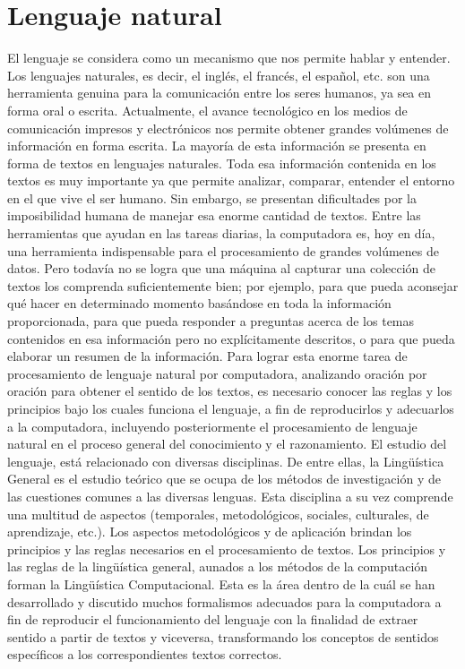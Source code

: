 \section{Lenguaje natural}
El lenguaje se considera como un mecanismo que nos permite hablar y entender. Los lenguajes naturales, es decir, el ingl\'es, el franc\'es, el espa\~nol, etc. son una herramienta genuina para la comunicaci\'on entre los seres humanos, ya sea en forma oral o escrita.
Actualmente, el avance tecnol\'ogico en los medios de comunicaci\'on impresos y electr\'onicos nos permite obtener grandes vol\'umenes de informaci\'on en forma escrita. La mayor\'ia de esta informaci\'on se presenta en forma de textos en lenguajes naturales. Toda esa informaci\'on contenida en los textos es muy importante ya que permite analizar, comparar, entender el entorno en el que vive el ser humano.
Sin embargo, se presentan dificultades por la imposibilidad humana de manejar esa enorme cantidad de textos. Entre las herramientas que ayudan en las tareas diarias, la computadora es, hoy en d\'ia, una herramienta indispensable para el procesamiento de grandes vol\'umenes de datos. Pero todav\'ia no se logra que una m\'aquina al capturar una colecci\'on de textos los comprenda suficientemente bien; por ejemplo, para que pueda aconsejar qu\'e hacer en determinado momento bas\'andose en toda la informaci\'on proporcionada, para que pueda responder a preguntas acerca de los temas contenidos en esa informaci\'on pero no expl\'icitamente descritos, o para que pueda elaborar un resumen de la informaci\'on.
Para lograr esta enorme tarea de procesamiento de lenguaje natural por computadora, analizando oraci\'on por oraci\'on para obtener el sentido de los textos, es necesario conocer las reglas y los principios bajo los cuales funciona el lenguaje, a fin de reproducirlos y adecuarlos a la computadora, incluyendo posteriormente el procesamiento de lenguaje natural en el proceso general del conocimiento y el razonamiento.
El estudio del lenguaje, est\'a relacionado con diversas disciplinas. De entre ellas, la Ling\"u\'istica General es el estudio te\'orico que se ocupa de los m\'etodos de investigaci\'on y de las cuestiones comunes a las diversas lenguas. Esta disciplina a su vez comprende una multitud de aspectos (temporales, metodol\'ogicos, sociales, culturales, de aprendizaje, etc.). Los aspectos metodol\'ogicos y de aplicaci\'on brindan los principios y las reglas necesarios en el procesamiento de textos.
Los principios y las reglas de la ling\"u\'istica general, aunados a los m\'etodos de la computaci\'on forman la Ling\"u\'istica Computacional. Esta es la \'area dentro de la cu\'al se han desarrollado y discutido muchos formalismos adecuados para la computadora a fin de reproducir el funcionamiento del lenguaje con la finalidad de extraer sentido a partir de textos y viceversa, transformando los conceptos de sentidos espec\'ificos a los correspondientes textos correctos. \cite{cic}